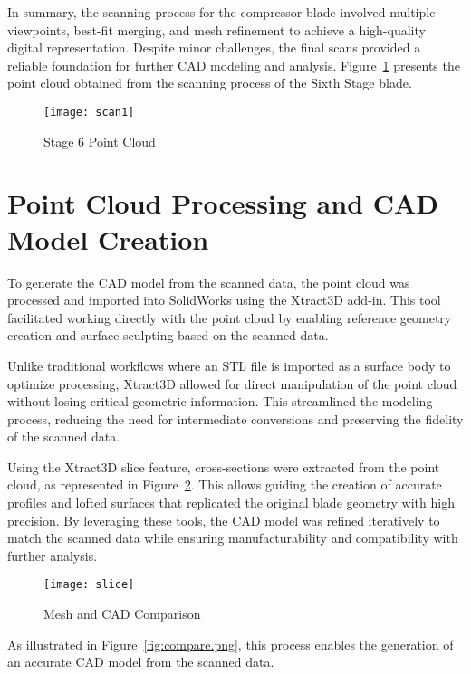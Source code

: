 In summary, the scanning process for the compressor blade involved multiple viewpoints, best-fit merging, and mesh refinement to achieve a high-quality digital representation. Despite minor challenges, the final scans provided a reliable foundation for further CAD modeling and analysis. Figure~\ref{fig:scan1} presents the point cloud obtained from the scanning process of the Sixth Stage blade.

\begin{figure}[H]
    \centering
    \texttt{[image: scan1]}
    \caption{Stage 6 Point Cloud}
    \label{fig:scan1}
\end{figure}

\section{Point Cloud Processing and CAD Model Creation}
\label{sec:cad}

To generate the CAD model from the scanned data, the point cloud was processed and imported into SolidWorks using the Xtract3D add-in. This tool facilitated working directly with the point cloud by enabling reference geometry creation and surface sculpting based on the scanned data.

Unlike traditional workflows where an STL file is imported as a surface body to optimize processing, Xtract3D allowed for direct manipulation of the point cloud without losing critical geometric information. This streamlined the modeling process, reducing the need for intermediate conversions and preserving the fidelity of the scanned data.

Using the Xtract3D slice feature, cross-sections were extracted from the point cloud, as represented in Figure~\ref{fig:slice}. This allows guiding the creation of accurate profiles and lofted surfaces that replicated the original blade geometry with high precision. By leveraging these tools, the CAD model was refined iteratively to match the scanned data while ensuring manufacturability and compatibility with further analysis.

\begin{figure}[H]
    \centering
    \texttt{[image: slice]}
    \caption{Mesh and CAD Comparison}
    \label{fig:slice}
\end{figure}

As illustrated in Figure~\ref{fig:compare.png}, this process enables the generation of an accurate CAD model from the scanned data.

